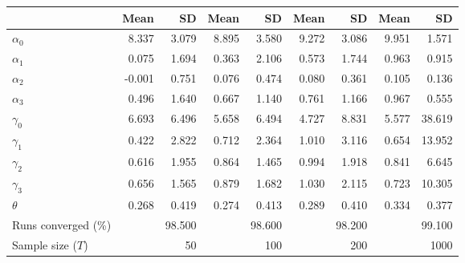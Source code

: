 
\begin{tabular}[t]{lrrrrrrrr}
\toprule
  & Mean & SD & Mean  & SD  & Mean   & SD   & Mean    & SD   \\
\midrule
$\alpha_{0}$ & 8.337 & 3.079 & 8.895 & 3.580 & 9.272 & 3.086 & 9.951 & 1.571\\
$\alpha_{1}$ & 0.075 & 1.694 & 0.363 & 2.106 & 0.573 & 1.744 & 0.963 & 0.915\\
$\alpha_{2}$ & -0.001 & 0.751 & 0.076 & 0.474 & 0.080 & 0.361 & 0.105 & 0.136\\
$\alpha_{3}$ & 0.496 & 1.640 & 0.667 & 1.140 & 0.761 & 1.166 & 0.967 & 0.555\\
$\gamma_{0}$ & 6.693 & 6.496 & 5.658 & 6.494 & 4.727 & 8.831 & 5.577 & 38.619\\
$\gamma_{1}$ & 0.422 & 2.822 & 0.712 & 2.364 & 1.010 & 3.116 & 0.654 & 13.952\\
$\gamma_{2}$ & 0.616 & 1.955 & 0.864 & 1.465 & 0.994 & 1.918 & 0.841 & 6.645\\
$\gamma_{3}$ & 0.656 & 1.565 & 0.879 & 1.682 & 1.030 & 2.115 & 0.723 & 10.305\\
$\theta$ & 0.268 & 0.419 & 0.274 & 0.413 & 0.289 & 0.410 & 0.334 & 0.377\\
Runs converged (\%) &  & 98.500 &  & 98.600 &  & 98.200 &  & 99.100\\
Sample size ($T$) &  & 50 &  & 100 &  & 200 &  & 1000\\
\bottomrule
\end{tabular}
